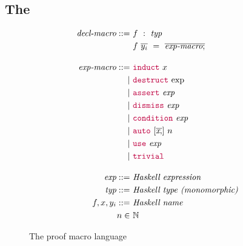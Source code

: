 % 
%  
\subsection{The \LangA}
\label{sec:proof-macro-lang}

\begin{figure}
\begin{align*}
  \textit{decl-macro} ::= &
    ~ f ~ : ~ \textit{typ} \\ &
    ~ f ~ \overline{y_i} ~ = ~ \overline{\textit{exp-macro} ;}
  \\[1em]
  \textit{exp-macro} ::= &
    ~ {\color{purple}\mathtt{induct}} ~ x \\ \mid &
    ~ {\color{purple}\mathtt{destruct}} ~ \text{exp} \\ \mid &
    ~ {\color{purple}\mathtt{assert}} ~ \textit{exp} \\ \mid &
    ~ {\color{purple}\mathtt{dismiss}} ~ \textit{exp} \\ \mid &
    ~ {\color{purple}\mathtt{condition}} ~ \textit{exp} \\ \mid &
    ~ {\color{purple}\mathtt{auto}} ~ [\overline{\textit{x} ,}] ~ n \\ \mid &
    ~ {\color{purple}\mathtt{use}} ~ \textit{exp} \\ \mid &
    ~ {\color{purple}\mathtt{trivial}}
  \\[1em]
  \textit{exp} ::= & ~ \textit{Haskell expression} 
  \\
  \textit{typ} ::= & ~ \textit{Haskell type (monomorphic)} 
  \\
  f, x, y_i ::= & ~ \textit{Haskell name} 
  \\
  n \in & ~ \mathbb{N}
\end{align*}
\caption{The proof macro language}
\label{fig:proof-macro-lang}
\end{figure}

